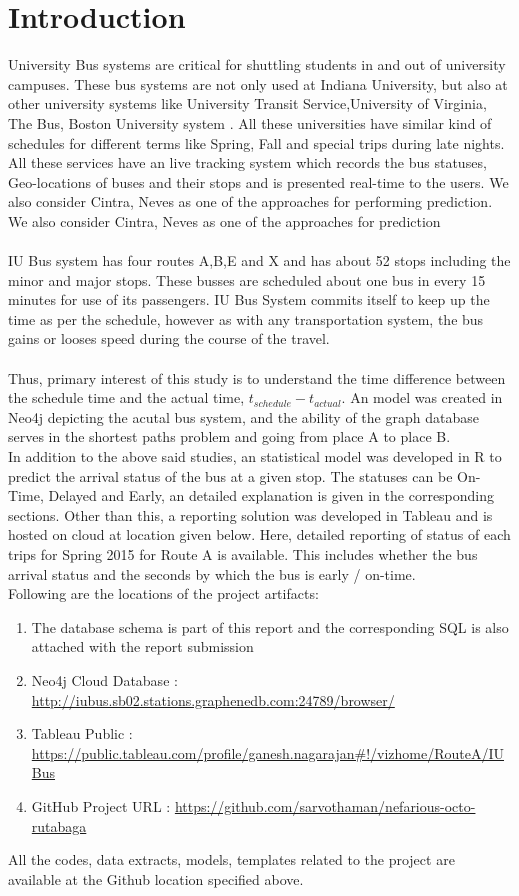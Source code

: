 \documentclass[12pt]{article}\usepackage[]{graphicx}\usepackage[]{color}
\begin{document}
\section{Introduction}
University Bus systems are critical for shuttling students in and out of university campuses. These bus systems are not only used at Indiana University, but also at other university systems like University Transit Service,University of Virginia\cite{2}, The Bus, Boston University system \cite{3}. All these universities have similar kind of schedules for different terms like Spring, Fall and special trips during late nights. All these services have an live tracking system which records the bus statuses, Geo-locations of buses and their stops and is presented real-time to the users. We also consider Cintra, Neves as one of the approaches for performing prediction. We also consider Cintra, Neves as one of the approaches for prediction\cite{4}\\ \\
IU Bus system has four routes A,B,E and X and has about 52 stops including the minor and major stops. These busses are scheduled about one bus in every 15 minutes for use of its passengers. IU Bus System commits itself to keep up the time as per the schedule\cite{5}, however as with any transportation system, the bus gains or looses speed during the course of the travel. \\ \\
Thus, primary interest of this study is to understand the time difference between the schedule time and the actual time, $t_{schedule} - t_{actual}$. An model was created in Neo4j depicting the acutal bus system, and the ability of the graph database serves in the shortest paths problem and going from place A to place B. \\
In addition to the above said studies, an statistical model was developed in R to predict the arrival status of the bus at a given stop. The statuses can be On-Time, Delayed and Early, an detailed explanation is given in the corresponding sections. Other than this, a reporting solution was developed in Tableau and is hosted on cloud at location given below. Here, detailed reporting of status of each trips for Spring 2015 for Route A is available. This includes whether the bus arrival status and the seconds by which the bus is early / on-time. \\

Following are the locations of the project artifacts:
\begin{enumerate}
\item The database schema is part of this report and the corresponding SQL is also attached with the report submission
\item Neo4j Cloud Database : \url{http://iubus.sb02.stations.graphenedb.com:24789/browser/}
\item Tableau Public : \url{https://public.tableau.com/profile/ganesh.nagarajan#!/vizhome/RouteA/IUBus}
\item GitHub Project URL : \url{https://github.com/sarvothaman/nefarious-octo-rutabaga}
\end{enumerate}
All the codes, data extracts, models, templates related to the project are available at the Github location specified above.
\end{document}
